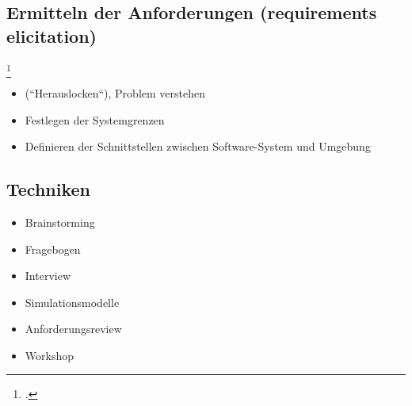 \documentclass{bschlangaul-theorie}
\begin{document}
%

\subsection{Ermitteln der Anforderungen (requirements elicitation)}\footcite[Seite
15]{sosy:fs:1}

\begin{itemize}
\item (“Herauslocken“), Problem verstehen
\item Festlegen der Systemgrenzen
\item Definieren der Schnittstellen zwischen Software-System und Umgebung
\end{itemize}

\subsection{Techniken}

\begin{itemize}
\item Brainstorming
\item Fragebogen
\item Interview
\item Simulationsmodelle
\item Anforderungsreview
\item Workshop
\end{itemize}

\literatur
\end{document}
